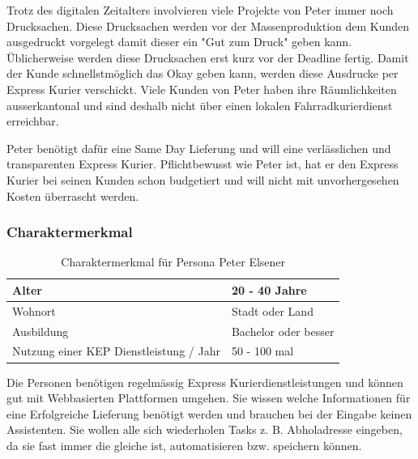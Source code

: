 Trotz des digitalen Zeitalters involvieren viele Projekte von Peter immer noch Drucksachen. Diese Drucksachen werden vor der Massenproduktion dem Kunden ausgedruckt vorgelegt damit dieser ein "Gut zum Druck" geben kann. Üblicherweise werden diese Drucksachen erst kurz vor der Deadline fertig. Damit der Kunde schnellstmöglich das Okay geben kann, werden diese Ausdrucke per Express Kurier verschickt. Viele Kunden von Peter haben ihre Räumlichkeiten ausserkantonal und sind deshalb nicht über einen lokalen Fahrradkurierdienst erreichbar.

Peter benötigt dafür eine Same Day Lieferung und will eine verlässlichen und transparenten Express Kurier. Pflichtbewusst wie Peter ist, hat er den Express Kurier bei seinen Kunden schon budgetiert und will nicht mit unvorhergesehen Kosten überrascht werden.

\subsubsection{Charaktermerkmal}
\begin{table}[]
\centering

\label{my-label}
\begin{tabular}{|l|l|}
\hline
Alter                                   & 20 - 40 Jahre        \\ \hline
Wohnort                                 & Stadt oder Land         \\ \hline
Ausbildung                              & Bachelor oder besser \\ \hline
Nutzung einer KEP Dienstleistung / Jahr & 50 - 100 mal            \\ \hline
\end{tabular}
\caption{Charaktermerkmal für Persona Peter Elsener}
\end{table}

Die Personen benötigen regelmässig Express Kurierdienstleistungen und können gut mit Webbasierten Plattformen umgehen. Sie wissen welche Informationen für eine Erfolgreiche Lieferung benötigt werden und brauchen bei der Eingabe keinen Assistenten. Sie wollen alle sich wiederholen Tasks z. B. \glqq Abholadresse eingeben\grqq, da sie fast immer die gleiche ist, automatisieren bzw. speichern können.

